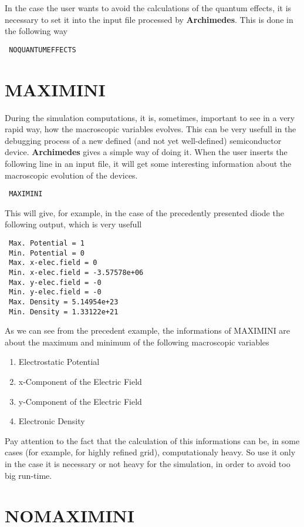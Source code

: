 \documentclass[12pt]{book}
\begin{document}
In the case the user wants to avoid the calculations of the quantum effects, it is necessary to set it into the input file processed by \textbf{Archimedes}. This is done in the following way
\begin{verbatim}
 NOQUANTUMEFFECTS
\end{verbatim}

\section{MAXIMINI}

During the simulation computations, it is, sometimes, important to see in a very rapid way, how the macroscopic variables evolves. This can be very usefull in the debugging process of a new defined (and not yet well-defined) semiconductor device. \textbf{Archimedes} gives a simple way of doing it. When the user inserts the following line in an input file, it will get some interesting information about the macroscopic evolution of the devices.
\begin{verbatim}
 MAXIMINI
\end{verbatim}
This will give, for example, in the case of the precedently presented diode the following output, which is very usefull
\begin{verbatim}
 Max. Potential = 1
 Min. Potential = 0
 Max. x-elec.field = 0
 Min. x-elec.field = -3.57578e+06
 Max. y-elec.field = -0
 Min. y-elec.field = -0
 Max. Density = 5.14954e+23
 Min. Density = 1.33122e+21
\end{verbatim}
As we can see from the precedent example, the informations of MAXIMINI are about the maximum and minimum of the following macroscopic variables
\begin{enumerate}
\item Electrostatic Potential
\item x-Component of the Electric Field
\item y-Component of the Electric Field
\item Electronic Density
\end{enumerate}
Pay attention to the fact that the calculation of this informations can be, in some cases (for example, for highly refined grid), computationaly heavy. So use it only in the case it is necessary or not heavy for the simulation, in order to avoid too big run-time.

\section{NOMAXIMINI}
\end{document}
